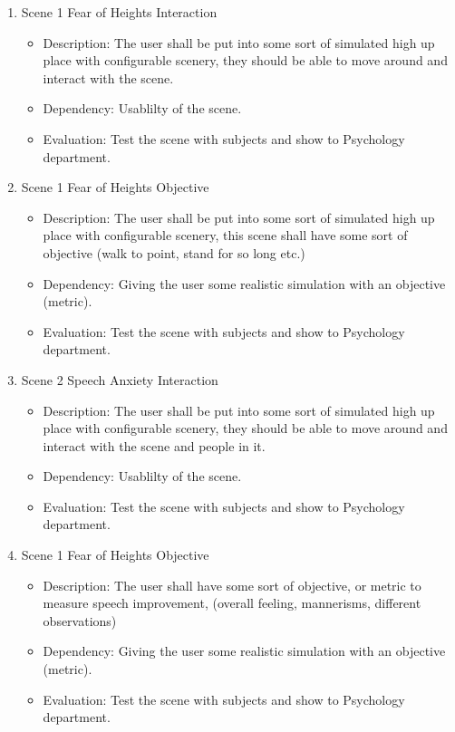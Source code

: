 \documentclass[a4paper,10pt]{article}
\begin{document}
\begin{enumerate}
		\item Scene 1 Fear of Heights Interaction 
		\begin{itemize}
		 \item Description: The user shall be put into some sort of simulated high up place with configurable scenery, they should be able to move around and interact with the scene.
		 \item Dependency: Usablilty of the scene.
		 \item Evaluation: Test the scene with subjects and show to Psychology department. 
		\end{itemize}
		
		\item Scene 1 Fear of Heights Objective 
		\begin{itemize}
		 \item Description: The user shall be put into some sort of simulated high up place with configurable scenery, this scene shall have some sort of objective (walk to point, stand for so long etc.)
		 \item Dependency: Giving the user some realistic simulation with an objective (metric).
		 \item Evaluation: Test the scene with subjects and show to Psychology department. 
		\end{itemize}
		
		\item Scene 2 Speech Anxiety Interaction
		\begin{itemize}
		 \item Description: The user shall be put into some sort of simulated high up place with configurable scenery, they should be able to move around and interact with the scene and people in it.
		 \item Dependency: Usablilty of the scene.
		 \item Evaluation: Test the scene with subjects and show to Psychology department. 
		\end{itemize}
		\item Scene 1 Fear of Heights Objective 
		\begin{itemize}
		 \item Description: The user shall have some sort of objective, or metric to measure speech improvement, (overall feeling, mannerisms, different observations)
		 \item Dependency: Giving the user some realistic simulation with an objective (metric).
		 \item Evaluation: Test the scene with subjects and show to Psychology department. 
		\end{itemize}
		

\end{enumerate}
\end{document}
